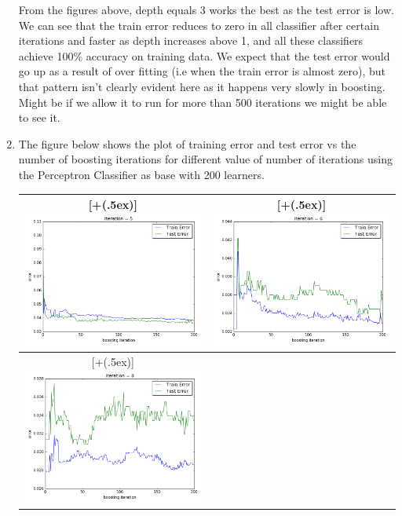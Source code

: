 \documentclass{article}
\newcommand*{\addheight}[2][.5ex]{%
  \raisebox{0pt}[\dimexpr\height+(#1)\relax]{#2}%
}
\begin{document}
\begin{enumerate}
From the figures above, depth equals 3 works the best as the test error is low. We can see that the train error reduces to zero in all classifier after certain iterations and faster as depth increases above 1, and all these classifiers achieve 100\% accuracy on training data. We expect that the test error would go up as a result of over fitting (i.e when the train error is almost zero), but that pattern isn't clearly evident here as it happens very slowly in boosting. Might be if we allow it to run for more than 500 iterations we might be able to see it.
\item
The figure below shows the plot of training error and test error vs the number of boosting iterations for different value of number of iterations using the Perceptron Classifier as base with 200 learners.
\begin{table}[h!]
\centering
\begin{tabular}{|c|c|}
	\hline
	\addheight{\includegraphics[width=70mm]{images/perceptron/5.png}} &
	\addheight{\includegraphics[width=70mm]{images/perceptron/6.png}} \\  
    \hline 
    \addheight{\includegraphics[width=70mm]{images/perceptron/8.png}} &

\end{tabular}
\end{table}
\end{enumerate}
\end{document}
